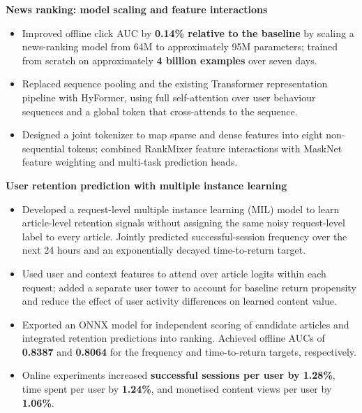 \documentclass{resume}
\begin{document}
\vspace{0.3em}
\textbf{News ranking: model scaling and feature interactions}
\begin{itemize}
  \item Improved offline click AUC by \textbf{0.14\% relative to the baseline} by scaling a news-ranking model from 64M to approximately 95M parameters; trained from scratch on approximately \textbf{4 billion examples} over seven days.
  \item Replaced sequence pooling and the existing Transformer representation pipeline with HyFormer, using full self-attention over user behaviour sequences and a global token that cross-attends to the sequence.
  \item Designed a joint tokenizer to map sparse and dense features into eight non-sequential tokens; combined RankMixer feature interactions with MaskNet feature weighting and multi-task prediction heads.
\end{itemize}

\textbf{User retention prediction with multiple instance learning}
\begin{itemize}
  \item Developed a request-level multiple instance learning (MIL) model to learn article-level retention signals without assigning the same noisy request-level label to every article. Jointly predicted successful-session frequency over the next 24 hours and an exponentially decayed time-to-return target.
  \item Used user and context features to attend over article logits within each request; added a separate user tower to account for baseline return propensity and reduce the effect of user activity differences on learned content value.
  \item Exported an ONNX model for independent scoring of candidate articles and integrated retention predictions into ranking. Achieved offline AUCs of \textbf{0.8387} and \textbf{0.8064} for the frequency and time-to-return targets, respectively.
  \item Online experiments increased \textbf{successful sessions per user by 1.28\%}, time spent per user by \textbf{1.24\%}, and monetised content views per user by \textbf{1.06\%}.
\end{itemize}
\end{document}
